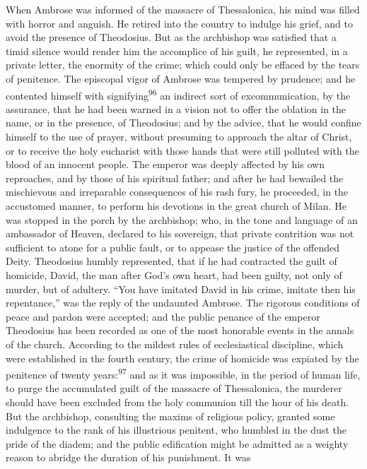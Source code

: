 When Ambrose was informed of the massacre of Thessalonica, his
mind was filled with horror and anguish. He retired into the
country to indulge his grief, and to avoid the presence of
Theodosius. But as the archbishop was satisfied that a timid
silence would render him the accomplice of his guilt, he
represented, in a private letter, the enormity of the crime;
which could only be effaced by the tears of penitence. The
episcopal vigor of Ambrose was tempered by prudence; and he
contented himself with signifying\textsuperscript{96} an indirect sort of
excommunication, by the assurance, that he had been warned in a
vision not to offer the oblation in the name, or in the presence,
of Theodosius; and by the advice, that he would confine himself
to the use of prayer, without presuming to approach the altar of
Christ, or to receive the holy eucharist with those hands that
were still polluted with the blood of an innocent people. The
emperor was deeply affected by his own reproaches, and by those
of his spiritual father; and after he had bewailed the
mischievous and irreparable consequences of his rash fury, he
proceeded, in the accustomed manner, to perform his devotions in
the great church of Milan. He was stopped in the porch by the
archbishop; who, in the tone and language of an ambassador of
Heaven, declared to his sovereign, that private contrition was
not sufficient to atone for a public fault, or to appease the
justice of the offended Deity. Theodosius humbly represented,
that if he had contracted the guilt of homicide, David, the man
after God’s own heart, had been guilty, not only of murder, but
of adultery. “You have imitated David in his crime, imitate then
his repentance,” was the reply of the undaunted Ambrose. The
rigorous conditions of peace and pardon were accepted; and the
public penance of the emperor Theodosius has been recorded as one
of the most honorable events in the annals of the church.
According to the mildest rules of ecclesiastical discipline,
which were established in the fourth century, the crime of
homicide was expiated by the penitence of twenty years:\textsuperscript{97} and as
it was impossible, in the period of human life, to purge the
accumulated guilt of the massacre of Thessalonica, the murderer
should have been excluded from the holy communion till the hour
of his death. But the archbishop, consulting the maxims of
religious policy, granted some indulgence to the rank of his
illustrious penitent, who humbled in the dust the pride of the
diadem; and the public edification might be admitted as a weighty
reason to abridge the duration of his punishment. It was
